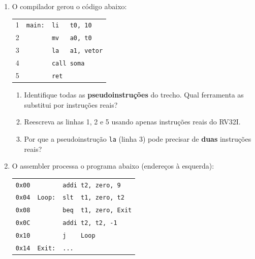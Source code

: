 \documentclass[11pt, a4paper]{article}
\begin{document}
\begin{enumerate}
\begin{enumerate}
  \item Quais linhas cont\^{e}m \textbf{diretivas} e quais produzem \textbf{instru\c{c}\~{o}es de m\'{a}quina}?
  \item Explique a fun\c{c}\~{a}o de cada diretiva que aparece no trecho.
  \item Se as diretivas n\~{a}o geram instru\c{c}\~{o}es, para que elas servem no object file?
\end{enumerate}

\item O compilador gerou o c\'{o}digo abaixo:

\begin{center}
\small
\begin{tabular}{rl}
1 & \texttt{main:\ \ li\ \ \ t0, 10}\\
2 & \texttt{\ \ \ \ \ \ \ mv\ \ \ a0, t0}\\
3 & \texttt{\ \ \ \ \ \ \ la\ \ \ a1, vetor}\\
4 & \texttt{\ \ \ \ \ \ \ call soma}\\
5 & \texttt{\ \ \ \ \ \ \ ret}\\
\end{tabular}
\end{center}

\begin{enumerate}
  \item Identifique todas as \textbf{pseudoinstru\c{c}\~{o}es} do trecho. Qual ferramenta as substitui por instru\c{c}\~{o}es reais?
  \item Reescreva as linhas 1, 2 e 5 usando apenas instru\c{c}\~{o}es reais do RV32I.
  \item Por que a pseudoinstru\c{c}\~{a}o \texttt{la} (linha 3) pode precisar de \textbf{duas} instru\c{c}\~{o}es reais?
\end{enumerate}

\item O assembler processa o programa abaixo (endere\c{c}os \`{a} esquerda):

\begin{center}
\small
\begin{tabular}{rll}
\texttt{0x00} & & \texttt{addi t2, zero, 9}\\
\texttt{0x04} & \texttt{Loop:} & \texttt{slt \ t1, zero, t2}\\
\texttt{0x08} & & \texttt{beq \ t1, zero, Exit}\\
\texttt{0x0C} & & \texttt{addi t2, t2, -1}\\
\texttt{0x10} & & \texttt{j \ \ \ Loop}\\
\texttt{0x14} & \texttt{Exit:} & \texttt{...}\\
\end{tabular}
\end{center}


\end{enumerate}
\end{document}
